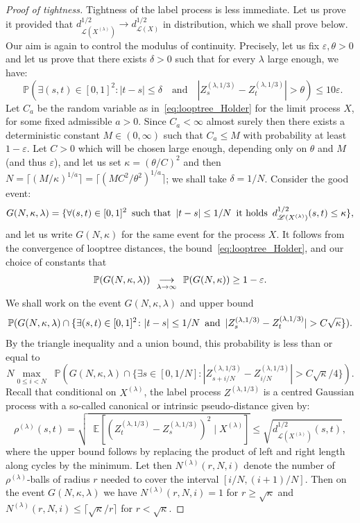 \documentclass[british, a4paper,11pt]{article}
\numberwithin{equation}{section}
\theoremstyle{definition}
\renewcommand{\P}{\mathop{}\!\mathbb{P}}
\newcommand{\E}{\mathop{}\!\mathbb{E}}
\newcommand{\Loop}{\mathscr{L}}
\newcommand{\cv}[1][n]{\enskip\mathop{\longrightarrow}^{}_{#1 \to \infty}\enskip}
\begin{document}
\begin{proof}[Proof of tightness]
Tightness of the label process is less immediate. Let us prove it provided that $d^{1/2}_{\Loop(X^{(\lambda)})} \to d^{1/2}_{\Loop(X)}$ in distribution, which we shall prove below.
Our aim is again to control the modulus of continuity. Precisely, let us fix $\varepsilon, \theta > 0$ and let us prove that there exists $\delta>0$ such that for every $\lambda$ large enough, we have:
\[\P(\exists (s,t) \in [0,1]^2 \colon |t-s| \leq \delta \quad\text{and}\quad |Z^{(\lambda, 1/3)}_s - Z^{(\lambda, 1/3)}_t| > \theta)
\leq 10 \varepsilon.\]
Let $C_a$ be the random variable as in~\eqref{eq:looptree_Holder} for the limit process $X$, for some fixed admissible $a>0$.
Since $C_a<\infty$ almost surely then there exists a deterministic constant $M \in (0,\infty)$ such that $C_a \leq M$ with probability at least $1-\varepsilon$.
Let $C>0$ which will be chosen large enough, depending only on $\theta$ and $M$ (and thus $\varepsilon$), and let us set $\kappa = (\theta / C)^2$ and then 
$N = \lceil (M/\kappa)^{1/a} \rceil = \lceil (MC^2 / \theta^2)^{1/a} \rceil$; we shall take $\delta = 1/N$.
Consider the
good event:
\[G(N,\kappa,\lambda) = \{\forall (s,t) \in [0,1]^2 \enskip\text{such that}\enskip |t-s| \leq 1/N \enskip\text{it holds}\enskip d^{1/2}_{\Loop(X^{(\lambda)})}(s,t) \leq \kappa\}
,\]
and let us write $G(N,\kappa)$ for the same event for the process $X$.
It follows from the convergence of looptree distances, the bound~\eqref{eq:looptree_Holder}, and our choice of constants that
\[\P(G(N,\kappa,\lambda)) \cv[\lambda] \P(G(N,\kappa)) \geq 1 - \varepsilon.\]
We shall work on the event $G(N,\kappa,\lambda)$ and upper bound
\[\P(G(N,\kappa,\lambda) \cap \{\exists (s,t) \in [0,1]^2 \colon |t-s| \leq 1/N \enskip\text{and}\enskip |Z^{(\lambda, 1/3)}_s - Z^{(\lambda, 1/3)}_t| > C \sqrt{\kappa}\})
.\]
By the triangle inequality and a union bound, this probability is less than or equal to
\[N \max_{0 \leq i < N} \P(G(N,\kappa,\lambda) \cap \{\exists s \in [0, 1/N] \colon |Z^{(\lambda, 1/3)}_{s+i/N} - Z^{(\lambda, 1/3)}_{i/N}| > C \sqrt{\kappa} / 4\})
.\]
Recall that conditional on $X^{(\lambda)}$, the label process $Z^{(\lambda, 1/3)}$ is a centred Gaussian process with a so-called canonical or intrinsic pseudo-distance given by:
\[\rho^{(\lambda)}(s,t) = \sqrt{\E[(Z^{(\lambda, 1/3)}_t - Z^{(\lambda, 1/3)}_s)^2 \mid X^{(\lambda)}]} \leq \sqrt{d^{1/2}_{\Loop(X^{(\lambda)})}(s,t)},\]
where the upper bound follows by replacing the product of left and right length along cycles by the minimum.
Let then $N^{(\lambda)}(r,N,i)$ denote the number of $\rho^{(\lambda)}$-balls of radius $r$ needed to cover the interval $[i/N, (i+1)/N]$. Then on the event $G(N,\kappa,\lambda)$ we have $N^{(\lambda)}(r,N,i) = 1$ for $r \geq \sqrt{\kappa}$ and $N^{(\lambda)}(r,N,i) \leq \lceil \sqrt{\kappa} / r \rceil$ for $r < \sqrt{\kappa}$.

\end{proof}
\end{document}
